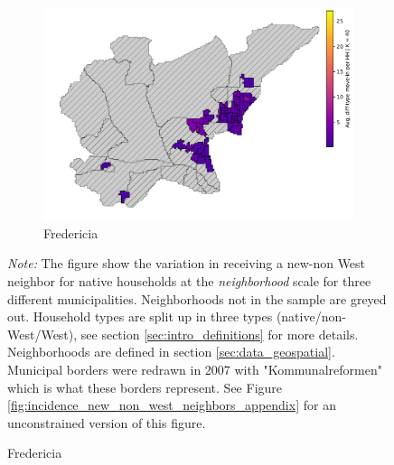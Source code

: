 \documentclass[main.tex]{subfiles}
\begin{document}
\begin{landscape}
\begin{figure}
	\begin{subfigure}{.55\textwidth}	
	\centering
	\includegraphics[width=\textwidth]{figs/fredericia_howdy_neighbor_sample.pdf}	
	\caption{Fredericia} \label{fig:incidence_different_type_fredericia}
	\end{subfigure}	
\begin{tablenotes}
\item \footnotesize \textit{Note:} The figure show the variation in receiving a new-non West neighbor for native households at the \textit{neighborhood} scale for three different municipalities. Neighborhoods not in the sample are greyed out. Household types are split up in three types (native/non-West/West), see section \ref{sec:intro_definitions} for more details. Neighborhoods are defined in section \ref{sec:data_geospatial}. Municipal borders were redrawn in 2007 with "Kommunalreformen" which is what these borders represent. See Figure \ref{fig:incidence_new_non_west_neighbors_appendix} for an unconstrained version of this figure.
\end{tablenotes}
\label{fig:incidence_new_non_west_neighbors}
\end{figure}
\end{landscape}
\end{document}

